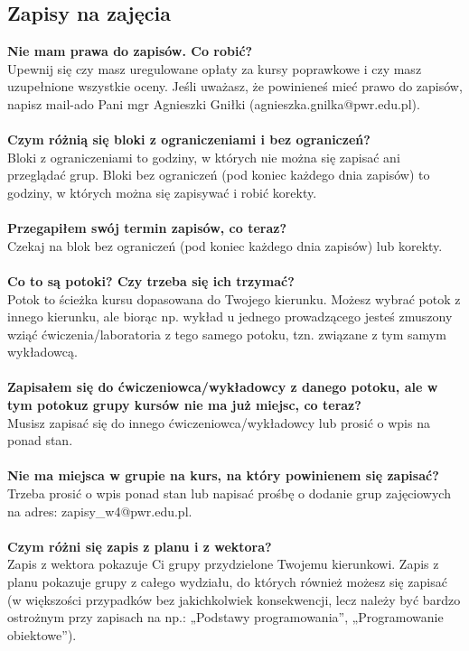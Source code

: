 \documentclass[11pt]{article}
\begin{document}
\subsection{Zapisy na zajęcia}
\textbf{Nie mam prawa do zapisów. Co robić?}\\
\indent Upewnij się czy masz uregulowane opłaty za kursy poprawkowe i czy masz uzupełnione wszystkie oceny. Jeśli uważasz, że powinieneś mieć prawo do zapisów, napisz mail-a\linebreak do Pani mgr Agnieszki Gniłki (agnieszka.gnilka@pwr.edu.pl).\\\\
\noindent \textbf{Czym różnią się bloki z ograniczeniami i bez ograniczeń?}\\
\indent Bloki z ograniczeniami to godziny, w których nie można się zapisać ani przeglądać grup. Bloki bez ograniczeń (pod koniec każdego dnia zapisów) to godziny, w których można się zapisywać i robić korekty.\\\\
\textbf{Przegapiłem swój termin zapisów, co teraz?}\\
\indent Czekaj na blok bez ograniczeń (pod koniec każdego dnia zapisów) lub korekty.\\\\
\textbf{Co to są potoki? Czy trzeba się ich trzymać?}\\
\indent Potok to ścieżka kursu dopasowana do Twojego kierunku. Możesz wybrać potok z innego kierunku, ale biorąc np. wykład u jednego prowadzącego jesteś zmuszony wziąć ćwiczenia/laboratoria z tego samego potoku, tzn. związane z tym samym wykładowcą.\\\\
\textbf{Zapisałem się do ćwiczeniowca/wykładowcy z danego potoku, ale w tym potoku\linebreak z grupy kursów nie ma już miejsc, co teraz?}\\
\indent Musisz zapisać się do innego ćwiczeniowca/wykładowcy lub prosić o wpis na ponad stan.\\\\
\textbf{Nie ma miejsca w grupie na kurs, na który powinienem się zapisać?}\\
\indent Trzeba prosić o wpis ponad stan lub napisać prośbę o dodanie grup zajęciowych na adres: zapisy\_w4@pwr.edu.pl.\\\\
\textbf{Czym różni się zapis z planu i z wektora?}\\
\indent Zapis z wektora pokazuje Ci grupy przydzielone Twojemu kierunkowi. Zapis z planu pokazuje grupy z całego wydziału, do których również możesz się zapisać (w większości przypadków bez jakichkolwiek konsekwencji, lecz należy być bardzo ostrożnym przy zapisach na np.: „Podstawy programowania”, „Programowanie obiektowe”).
\end{document}
